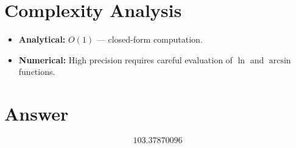 \documentclass[11pt]{article}
\begin{document}
\section{Complexity Analysis}
\begin{itemize}
    \item \textbf{Analytical:} $O(1)$ --- closed-form computation.
    \item \textbf{Numerical:} High precision requires careful evaluation of $\ln$ and $\arcsin$ functions.
\end{itemize}

\section{Answer}

\[
\boxed{103.37870096}
\]
\end{document}
